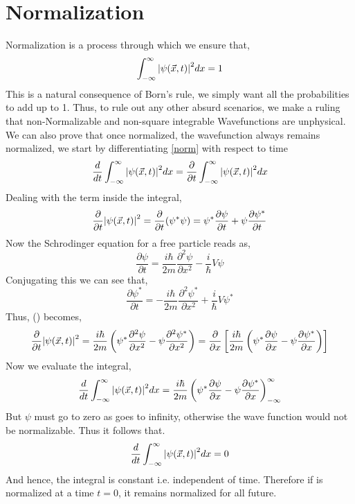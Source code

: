 \section{Normalization}
Normalization is a process through which we ensure that,
\begin{equation}\label{norm}
	\int_{- \infty}^{\infty} \abs{\psi(\vec{x}, t)}^{2} dx = 1
\end{equation}
This is a natural consequence of Born's rule, we simply want all the probabilities to add up to 1. Thus, to rule out any other absurd scenarios, we make a ruling that non-Normalizable and non-square integrable Wavefunctions are unphysical.\\
We can also prove that once normalized, the wavefunction always remains normalized, we start by differentiating \ref{norm} with respect to time\\
$$\frac{d}{dt} \int_{- \infty}^{\infty} \abs{\psi(\vec{x}, t)}^{2} dx = \frac{\partial}{\partial t}\int_{- \infty}^{\infty} \abs{\psi(\vec{x}, t)}^{2} dx$$
Dealing with the term inside the integral,
$$ \frac{\partial}{\partial t}\abs{\psi(\vec{x}, t)}^{2} = \frac{\partial}{\partial t} (\psi^{*} \psi ) = \psi^{*}\frac{\partial \psi}{\partial t} + \psi\frac{\partial \psi^{*}}{\partial t}$$
Now the Schrodinger equation for a free particle reads as,
$$\frac{\partial \psi}{\partial t} = \frac{i \hbar}{2m}\frac{\partial^{2} \psi}{\partial x^{2}} - \frac{i}{\hbar}V \psi$$
Conjugating this we can see that,
$$\frac{\partial \psi^{*}}{\partial t} = -\frac{i \hbar}{2m}\frac{\partial^{2} \psi^{*}}{\partial x^{2}} + \frac{i}{\hbar}V \psi^{*}$$
Thus, () becomes,
$$\frac{\partial}{\partial t}\abs{\psi(\vec{x}, t)}^{2} = \frac{i \hbar}{2m}\left( \psi^{*} \frac{\partial^{2} \psi}{\partial x^{2}} - \psi \frac{\partial^{2} \psi^{*}}{\partial x^{2}} \right) = \frac{\partial }{\partial x}\left[\frac{i \hbar}{2m}\left( \psi^{*} \frac{\partial \psi}{\partial x} - \psi \frac{\partial \psi^{*}}{\partial x} \right)\right]$$
Now we evaluate the integral,
$$\frac{d}{dt} \int_{- \infty}^{\infty} \abs{\psi(\vec{x}, t)}^{2} dx = \frac{i \hbar}{2m}\left( \psi^{*} \frac{\partial \psi}{\partial x} - \psi \frac{\partial \psi^{*}}{\partial x} \right)^{\infty}_{- \infty} $$
But $\psi$ must go to zero as goes to infinity, otherwise the wave function would not be normalizable. Thus it follows that.
\begin{equation}
	\frac{d}{dt} \int_{- \infty}^{\infty} \abs{\psi(\vec{x}, t)}^{2} dx = 0
\end{equation}
And hence, the integral is constant i.e. independent of time. Therefore if is normalized at a time $t = 0$, it remains normalized for all future. 
